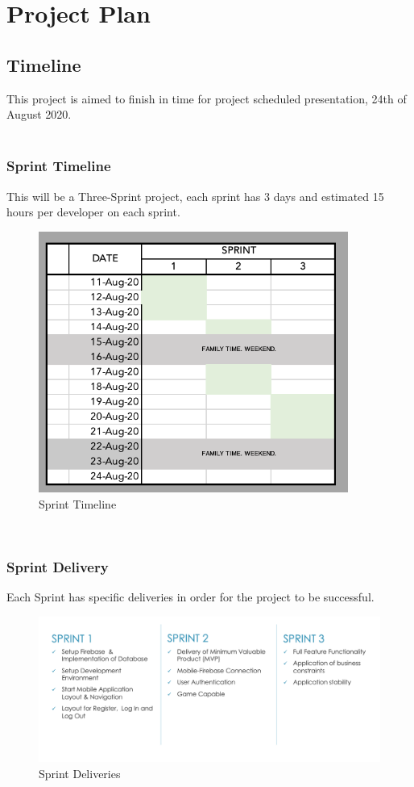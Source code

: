 \documentclass{article}
\begin{document}
\newpage

\section{Project Plan}
    \subsection{Timeline}
        This project is aimed to finish in time for project scheduled presentation, 24th of August 2020.\\\\
        \subsubsection{Sprint Timeline}
        This will be a Three-Sprint project, each sprint has 3 days and estimated 15 hours per developer on each sprint.\\
        \begin{figure}[h]
        \centering
        \includegraphics[width=4in]{images/Sprint Timeline.png}
        \caption{Sprint Timeline}
        \end{figure} 
        ~\\
        \newpage
        \subsubsection{Sprint Delivery}
        Each Sprint has specific deliveries in order for the project to be successful.\\
        \begin{figure}[h]
            \centering
            \includegraphics[width=5.5in]{images/Sprint Deliveries.png}
            \caption{Sprint Deliveries}
        \end{figure}
        \\
        ~\\
    \newpage
\end{document}

